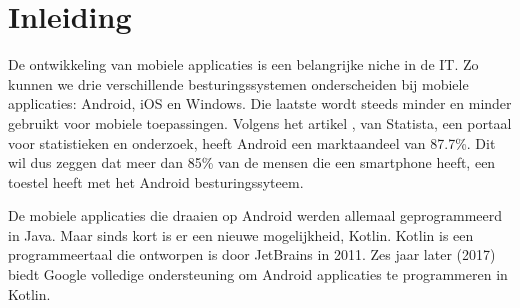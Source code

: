 
\chapter*{Inleiding}
\label{ch:inleiding}




 De ontwikkeling van mobiele applicaties is een belangrijke niche in de IT. Zo kunnen we drie verschillende besturingssystemen onderscheiden bij mobiele applicaties: Android, iOS en Windows. Die laatste wordt steeds minder en minder gebruikt voor mobiele toepassingen. Volgens het artikel \textcite{Statista2018}, van Statista, een portaal voor statistieken en onderzoek, heeft Android een marktaandeel van 87.7\%. Dit wil dus zeggen dat meer dan 85\% van de mensen die een smartphone heeft, een toestel heeft met het Android besturingssyteem. 

 De mobiele applicaties die draaien op Android werden allemaal geprogrammeerd in Java. Maar sinds kort is er een nieuwe mogelijkheid, Kotlin. Kotlin is een programmeertaal die ontworpen is door JetBrains in 2011. Zes jaar later (2017) biedt Google volledige ondersteuning om Android applicaties te programmeren in Kotlin. 

